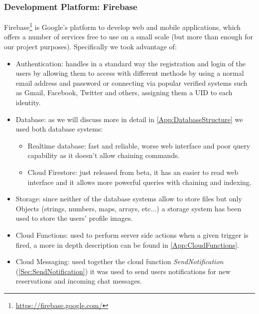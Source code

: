 \subsubsection{Development Platform: Firebase}
\label{sub:Firebase}
Firebase\footnote{\url{https://firebase.google.com/}} is Google's platform to develop web and mobile applications, which offers a number of services free to use on a small scale (but more than enough for our project purposes). Specifically we took advantage of:
\begin{itemize}
\item Authentication: handles in a standard way the registration and login of the users by allowing them to access with different methods by using a normal email address and password or connecting via popular verified systems such as Gmail, Facebook, Twitter and others, assigning them a UID to each identity.
\item Database: as we will discuss more in detail in \autoref{App:DatabaseStructure} we used both database systems:
	\begin{itemize}
	\item Realtime database: fast and reliable, worse web interface and poor query 	capability as it doesn't allow chaining commands.
	\item Cloud Firestore: just released from beta, it has an easier to read web interface and it allows more powerful queries with 			chaining and indexing.
	\end{itemize}
\item Storage: since neither of the database systems allow to store files but only Objects (strings, numbers, maps, arrays, etc...) a storage system has been used to store the users' profile images.
\item Cloud Functions: used to perform server side actions when a given trigger is fired, a more in depth description can be found in \autoref{App:CloudFunctions}.
\item Cloud Messaging: used together the cloud function \emph{SendNotification} (\autoref{Sec:SendNotification}) it was used to send users notifications for new reservations and incoming chat messages.
\end{itemize}
\clearpage
